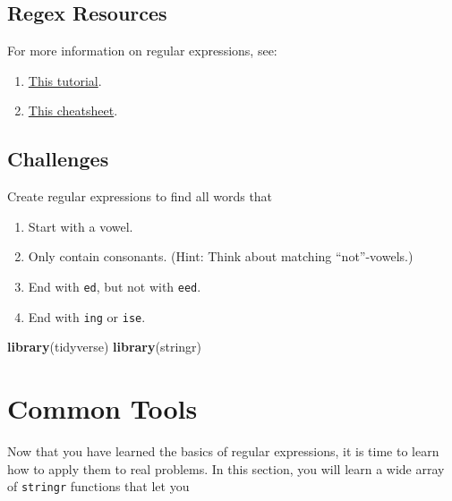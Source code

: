 \documentclass[]{book}
\newenvironment{Shaded}{\begin{snugshade}}{\end{snugshade}}
\newcommand{\KeywordTok}[1]{\textcolor[rgb]{0.13,0.29,0.53}{\textbf{#1}}}
\newcommand{\NormalTok}[1]{#1}
\providecommand{\tightlist}{%
  \setlength{\itemsep}{0pt}\setlength{\parskip}{0pt}}
\begin{document}
\hypertarget{htmlwidget-d11fc4360aa0230696d7}{}

\subsection{Regex Resources}\label{regex-resources}

For more information on regular expressions, see:

\begin{enumerate}
\def\labelenumi{\arabic{enumi}.}
\tightlist
\item
  \href{http://regextutorials.com/}{This tutorial}.
\item
  \href{https://medium.com/factory-mind/regex-tutorial-a-simple-cheatsheet-by-examples-649dc1c3f285}{This
  cheatsheet}.
\end{enumerate}

\subsection{Challenges}\label{challenges-15}

Create regular expressions to find all words that

\begin{enumerate}
\def\labelenumi{\arabic{enumi}.}
\item
  Start with a vowel.
\item
  Only contain consonants. (Hint: Think about matching ``not''-vowels.)
\item
  End with \texttt{ed}, but not with \texttt{eed}.
\item
  End with \texttt{ing} or \texttt{ise}.
\end{enumerate}

\begin{Shaded}
\begin{Highlighting}[]
\KeywordTok{library}\NormalTok{(tidyverse)}
\KeywordTok{library}\NormalTok{(stringr)}
\end{Highlighting}
\end{Shaded}

\section{Common Tools}\label{common-tools}

Now that you have learned the basics of regular expressions, it is time
to learn how to apply them to real problems. In this section, you will
learn a wide array of \texttt{stringr} functions that let you
\end{document}
